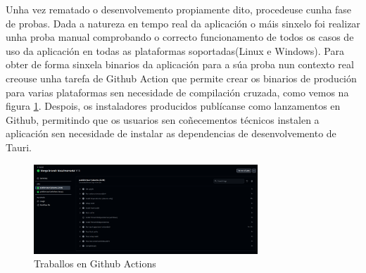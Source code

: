 Unha vez rematado o desenvolvemento propiamente dito, procedeuse cunha fase de probas. Dada a natureza en tempo real da aplicación o máis sinxelo foi realizar unha proba manual comprobando o correcto funcionamento de todos os casos de uso da aplicación en todas as plataformas soportadas(Linux e Windows). Para obter de forma sinxela binarios da aplicación para a súa proba nun contexto real creouse unha tarefa de Github Action que permite crear os binarios de produción para varias plataformas sen necesidade de compilación cruzada, como vemos na figura \ref{fig:cd}. Despois, os instaladores producidos publícanse como lanzamentos en Github, permitindo que os usuarios sen coñecementos técnicos instalen a aplicación sen necesidade de instalar as dependencias de desenvolvemento de Tauri.

\begin{figure}[hp!]
  \centering
  \includegraphics[width=0.75\textwidth]{imaxes/cd.png}
  \caption{Traballos en Github Actions}
  \label{fig:cd}
\end{figure}


